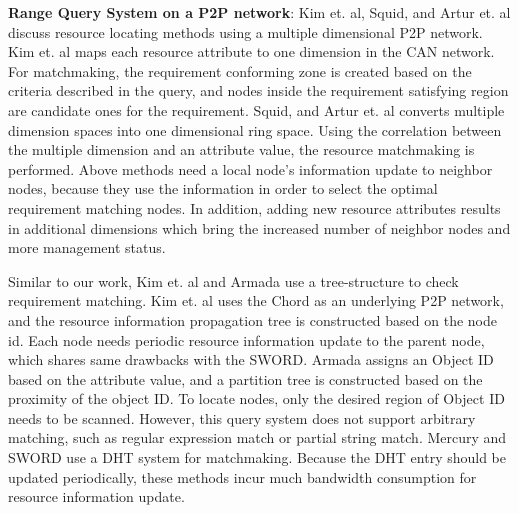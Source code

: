 \documentclass{acm_proc_article-sp}
\begin{document}
\textbf{Range Query System on a P2P network}: Kim et. al\cite{can_query}, Squid\cite{squid}, and Artur et. al\cite{query_for_grid} discuss resource locating methods using a multiple dimensional P2P network. 
Kim et. al\cite{can_query} maps each resource attribute to one dimension in the CAN network. For matchmaking, the requirement conforming zone is created based on the criteria described in the query, 
and nodes inside the requirement satisfying region are candidate ones for the requirement.
Squid\cite{squid}, and Artur et. al\cite{query_for_grid} converts multiple dimension spaces into one dimensional ring space. Using the correlation between the multiple dimension and an attribute value, 
the resource matchmaking is performed. 
Above methods need a local node's information update to neighbor nodes, because they use the information in order to select the optimal requirement matching nodes.  
In addition, adding new resource attributes results in additional dimensions which bring the increased number of neighbor nodes and more management status.

Similar to our work, Kim et. al\cite{chord_matching} and Armada\cite{armada} use a tree-structure to check requirement matching. 
Kim et. al\cite{chord_matching} uses the Chord as an underlying P2P network, and the resource information propagation tree is
constructed based on the node id. Each node needs periodic resource information update to the parent node, which shares same drawbacks with the SWORD.
Armada\cite{armada} assigns an Object ID based on the attribute value, and a partition tree is constructed based on the proximity of the object ID. 
To locate nodes, only the desired region of Object ID needs to be scanned. However, this query system does not support arbitrary matching, such as regular expression match or partial string match.
Mercury\cite{mercury} and SWORD\cite{sword} use a DHT system for matchmaking. 
Because the DHT entry should be updated periodically, these methods incur much bandwidth consumption for resource information update.
\end{document}
